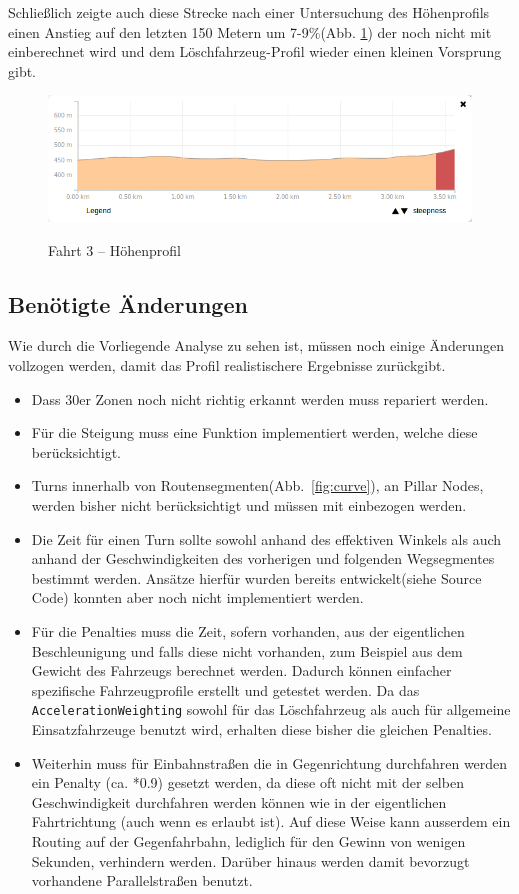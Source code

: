 Schließlich zeigte auch diese Strecke nach einer Untersuchung des Höhenprofils einen Anstieg auf den letzten 150 Metern um 7-9$\%$(Abb. \ref{fig:profile2}) der noch nicht mit einberechnet wird und dem Löschfahrzeug-Profil wieder einen kleinen Vorsprung gibt.

\begin{figure}[htb]
\centering
\caption{Fahrt 3 -- Höhenprofil}
\label{fig:profile2}
\includegraphics[width = 0.90 \textwidth]{../media/Fahrt3_Profile.png} \\
\end{figure}


\subsection{Benötigte Änderungen}

Wie durch die Vorliegende Analyse zu sehen ist, müssen noch einige Änderungen vollzogen werden, damit das Profil realistischere Ergebnisse zurückgibt.\par
\begin{itemize}
\item Dass 30er Zonen noch nicht richtig erkannt werden muss repariert werden.
\item Für die Steigung muss eine Funktion implementiert werden, welche diese berücksichtigt.
\item Turns innerhalb von Routensegmenten(Abb.~\ref{fig:curve}), an Pillar Nodes, werden bisher nicht berücksichtigt und müssen mit einbezogen werden.
\item Die Zeit für einen Turn sollte sowohl anhand des effektiven Winkels als auch anhand der Geschwindigkeiten des vorherigen und folgenden Wegsegmentes bestimmt werden.
Ansätze hierfür wurden bereits entwickelt(siehe Source Code) konnten aber noch nicht implementiert werden.
\item Für die Penalties muss die Zeit, sofern vorhanden, aus der eigentlichen Beschleunigung und falls diese nicht vorhanden, zum Beispiel aus dem Gewicht des Fahrzeugs berechnet werden.
Dadurch können einfacher spezifische Fahrzeugprofile erstellt und getestet werden.
Da das \texttt{AccelerationWeighting} sowohl für das Löschfahrzeug als auch für allgemeine Einsatzfahrzeuge benutzt wird, erhalten diese bisher die gleichen Penalties.
\item Weiterhin muss für Einbahnstraßen die in Gegenrichtung durchfahren werden ein Penalty (ca. *0.9) gesetzt werden, da diese oft nicht mit der selben Geschwindigkeit durchfahren werden können wie in der eigentlichen Fahrtrichtung (auch wenn es erlaubt ist).
Auf diese Weise kann ausserdem ein Routing auf der Gegenfahrbahn, lediglich für den Gewinn von wenigen Sekunden, verhindern werden.
Darüber hinaus werden damit bevorzugt vorhandene Parallelstraßen benutzt.
\end{itemize}